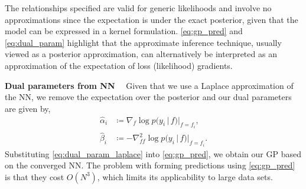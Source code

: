 \documentclass{article}
\renewcommand{\paragraph}[1]{{\bf #1}~~}
\renewcommand{\mid}{\,|\,}
\begin{document}
%
The relationships specified are valid for generic likelihoods and involve no approximations since the expectation is under the
exact posterior, given that the model can be expressed in a kernel formulation.
\cref{eq:gp_pred} and \cref{eq:dual_param} highlight that the approximate inference technique, usually viewed as a posterior approximation,
can alternatively be interpreted as an approximation of the expectation of loss (likelihood) gradients.


\paragraph{Dual parameters from NN}
Given that we use a Laplace approximation of the NN, we remove the expectation over the posterior \citep[see Ch.3.4.1 in][for derivation]{rasmussen2006gaussian} and our dual parameters are given by,
%
\begin{subequations}
\label{eq:dual_param_laplace}
\begin{align}
  \hat{\alpha}_i &\coloneqq \nabla_{f}\log p(y_i \mid f) |_{f=f_i} , \\
  \hat{\beta}_i &\coloneqq - \nabla^2_{ff}\log p(y_i \mid f) |_{f=f_i}.
  \end{align}
\end{subequations}
%
Substituting \cref{eq:dual_param_laplace} into \cref{eq:gp_pred}, we obtain our GP based on the converged NN. The problem with forming predictions using \cref{eq:gp_pred} is that they cost $O(N^3)$, which limits its applicability to large data sets.
\end{document}
